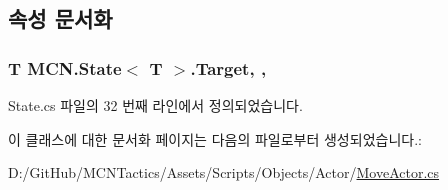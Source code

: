 \subsection{속성 문서화}
\subsubsection[{\texorpdfstring{Target}{Target}}]{\setlength{\rightskip}{0pt plus 5cm}T {\bf M\+C\+N.\+State}$<$ T $>$.Target\hspace{0.3cm}{\ttfamily [get]}, {\ttfamily [protected]}, {\ttfamily [inherited]}}\hypertarget{class_m_c_n_1_1_state_a93ba2fd920292031bd6e65b1dc505cb3}{}\label{class_m_c_n_1_1_state_a93ba2fd920292031bd6e65b1dc505cb3}


State.\+cs 파일의 32 번째 라인에서 정의되었습니다.



이 클래스에 대한 문서화 페이지는 다음의 파일로부터 생성되었습니다.\+:\begin{DoxyCompactItemize}
\item 
D\+:/\+Git\+Hub/\+M\+C\+N\+Tactics/\+Assets/\+Scripts/\+Objects/\+Actor/\hyperlink{_move_actor_8cs}{Move\+Actor.\+cs}\end{DoxyCompactItemize}
